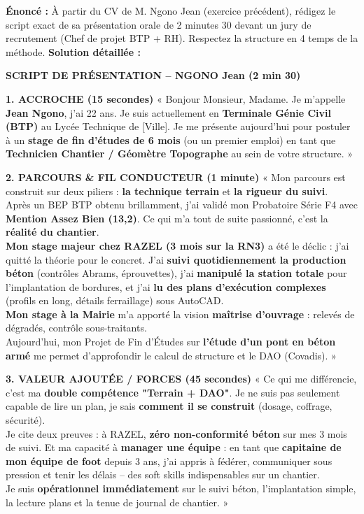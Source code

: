 \documentclass[11pt]{article}
\begin{document}
\begin{exoresolu}
\textbf{Énoncé :} À partir du CV de M. Ngono Jean (exercice précédent), rédigez le script exact de sa présentation orale de 2 minutes 30 devant un jury de recrutement (Chef de projet BTP + RH). Respectez la structure en 4 temps de la méthode.
\tcblower
\textbf{Solution détaillée :}

\textbf{SCRIPT DE PRÉSENTATION -- NGONO Jean (2 min 30)}

\textbf{1. ACCROCHE (15 secondes)}
« Bonjour Monsieur, Madame. Je m'appelle \textbf{Jean Ngono}, j'ai 22 ans. Je suis actuellement en \textbf{Terminale Génie Civil (BTP)} au Lycée Technique de [Ville]. Je me présente aujourd'hui pour postuler à un \textbf{stage de fin d'études de 6 mois} (ou un premier emploi) en tant que \textbf{Technicien Chantier / Géomètre Topographe} au sein de votre structure. »

\textbf{2. PARCOURS \& FIL CONDUCTEUR (1 minute)}
« Mon parcours est construit sur deux piliers : \textbf{la technique terrain} et \textbf{la rigueur du suivi}. \\
Après un BEP BTP obtenu brillamment, j'ai validé mon Probatoire Série F4 avec \textbf{Mention Assez Bien (13,2)}. Ce qui m'a tout de suite passionné, c'est la \textbf{réalité du chantier}. \\
\textbf{Mon stage majeur chez RAZEL (3 mois sur la RN3)} a été le déclic : j'ai quitté la théorie pour le concret. J'ai \textbf{suivi quotidiennement la production béton} (contrôles Abrams, éprouvettes), j'ai \textbf{manipulé la station totale} pour l'implantation de bordures, et j'ai \textbf{lu des plans d'exécution complexes} (profils en long, détails ferraillage) sous AutoCAD. \\
\textbf{Mon stage à la Mairie} m'a apporté la vision \textbf{maîtrise d'ouvrage} : relevés de dégradés, contrôle sous-traitants. \\
Aujourd'hui, mon Projet de Fin d'Études sur \textbf{l'étude d'un pont en béton armé} me permet d'approfondir le calcul de structure et le DAO (Covadis). »

\textbf{3. VALEUR AJOUTÉE / FORCES (45 secondes)}
« Ce qui me différencie, c'est ma \textbf{double compétence "Terrain + DAO"}. Je ne suis pas seulement capable de lire un plan, je sais \textbf{comment il se construit} (dosage, coffrage, sécurité). \\
Je cite deux preuves : à RAZEL, \textbf{zéro non-conformité béton} sur mes 3 mois de suivi. Et ma capacité à \textbf{manager une équipe} : en tant que \textbf{capitaine de mon équipe de foot} depuis 3 ans, j'ai appris à fédérer, communiquer sous pression et tenir les délais -- des soft skills indispensables sur un chantier. \\
Je suis \textbf{opérationnel immédiatement} sur le suivi béton, l'implantation simple, la lecture plans et la tenue de journal de chantier. »


\end{exoresolu}
\end{document}
